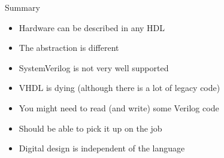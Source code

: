 \begin{frame}[fragile]{Summary}
\begin{itemize}
\item Hardware can be described in any HDL
\item The abstraction is different
\item SystemVerilog is not very well supported
\item VHDL is dying (although there is a lot of legacy code)
\item You might need to read (and write) some Verilog code
\item Should be able to pick it up on the job
\item Digital design is independent of the language
\end{itemize}
\end{frame}







